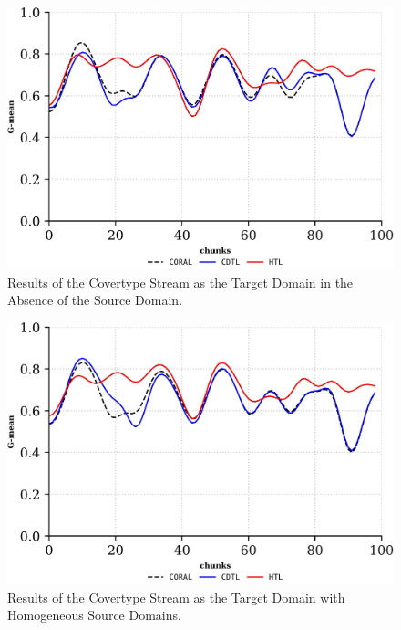 \begin{figure}[!ht]
	\centering
	\includegraphics[width=1\linewidth]{6_transfer_learning/figures/exp1_0.png}
  \caption{Results of the Covertype Stream as the Target Domain in the Absence of the Source Domain.}

	\label{fig:6_exp1}
\end{figure}
\begin{figure}[!ht]
	\centering
	\includegraphics[width=1\linewidth]{6_transfer_learning/figures/exp1_1.png}
	\caption{Results of the Covertype Stream as the Target Domain with Homogeneous Source Domains.}

	\label{fig:6_exp2}
\end{figure}

